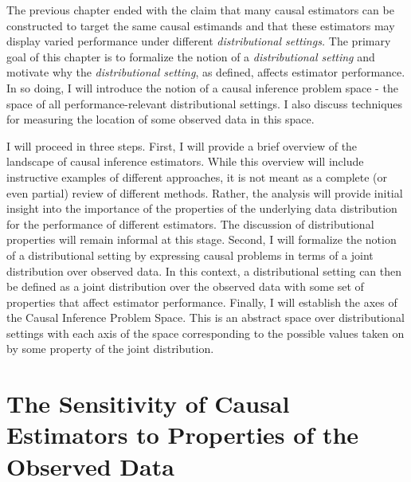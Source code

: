 \documentclass[../main.tex]{subfiles}
\begin{document}

The previous chapter ended with the claim that many causal estimators can be constructed to target the same causal estimands and that these estimators may display varied performance under different \textit{distributional settings.} The primary goal of this chapter is to formalize the notion of a \textit{distributional setting} and motivate why the \textit{distributional setting}, as defined, affects estimator performance. In so doing, I will introduce the notion of a causal inference problem space - the space of all performance-relevant distributional settings. I also discuss techniques for measuring the location of some observed data in this space.\par

\vspace{\baselineskip}

I will proceed in three steps. First, I will provide a brief overview of the landscape of causal inference estimators. While this overview will include instructive examples of different approaches, it is not meant as a complete (or even partial) review of different methods. Rather, the analysis will provide initial insight into the importance of the properties of the underlying data distribution for the performance of different estimators. The discussion of distributional properties will remain informal at this stage. Second, I will formalize the notion of a distributional setting by expressing causal problems in terms of a joint distribution over observed data. In this context, a distributional setting can then be defined as a joint distribution over the observed data with some set of properties that affect estimator performance. Finally, I will establish the axes of the Causal Inference Problem Space. This is an abstract space over distributional settings with each axis of the space corresponding to the possible values taken on by some property of the joint distribution.\par

\section{The Sensitivity of Causal Estimators to Properties of the Observed Data}
\end{document}
